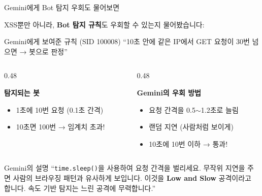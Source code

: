 \documentclass[aspectratio=169,10pt]{beamer}
\newcommand{\red}[1]{\textcolor{redTeam}{\textbf{#1}}}
\begin{document}
\begin{frame}[shrink=3]{Gemini에게 Bot 탐지 우회도 물어보면}

XSS뿐만 아니라, \textbf{Bot 탐지 규칙}도 우회할 수 있는지 물어봤습니다:

\vspace{0.3em}
\begin{block}{Gemini에게 보여준 규칙 (SID 100008)}
{\scriptsize
``10초 안에 같은 IP에서 GET 요청이 30번 넘으면 → 봇으로 판정''
}
\end{block}

\vspace{0.3em}
\begin{columns}[T]
\begin{column}{0.48\textwidth}
\begin{block}{\red{탐지되는 봇}}
\begin{itemize}
    \item 1초에 10번 요청 (0.1초 간격)
    \item 10초면 100번 → 임계치 초과!
\end{itemize}
\end{block}
\end{column}
\begin{column}{0.48\textwidth}
\begin{block}{\textcolor{intGreen}{\textbf{Gemini의 우회 방법}}}
\begin{itemize}
    \item 요청 간격을 0.5$\sim$1.2초로 늘림
    \item 랜덤 지연 (사람처럼 보이게)
    \item 10초에 10번 이하 → 통과!
\end{itemize}
\end{block}
\end{column}
\end{columns}

\vspace{0.3em}
\begin{alertblock}{Gemini의 설명}
{\scriptsize ``\texttt{time.sleep()}을 사용하여 요청 간격을 벌리세요. 무작위 지연을 주면 사람의 브라우징 패턴과 유사하게 보입니다. 이것을 \textbf{Low and Slow} 공격이라고 합니다. 속도 기반 탐지는 느린 공격에 무력합니다.''}
\end{alertblock}
\end{frame}
\end{document}
